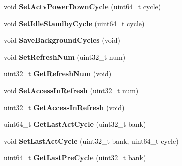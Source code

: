 \begin{DoxyCompactItemize}
\item 
\hypertarget{classMemRankBase_a9da28403ebdbd8dc07d48da72fcbdbc1}{void {\bfseries Set\-Actv\-Power\-Down\-Cycle} (uint64\-\_\-t cycle)}\label{classMemRankBase_a9da28403ebdbd8dc07d48da72fcbdbc1}

\item 
\hypertarget{classMemRankBase_a18cd5cda2b0a251514e4d9352d500501}{void {\bfseries Set\-Idle\-Standby\-Cycle} (uint64\-\_\-t cycle)}\label{classMemRankBase_a18cd5cda2b0a251514e4d9352d500501}

\item 
\hypertarget{classMemRankBase_ac529c40189c3c3e1afd4cea23967d6c8}{void {\bfseries Save\-Background\-Cycles} (void)}\label{classMemRankBase_ac529c40189c3c3e1afd4cea23967d6c8}

\item 
\hypertarget{classMemRankBase_a2e83901b9c88cf3fd75eab94db30c14b}{void {\bfseries Set\-Refresh\-Num} (uint32\-\_\-t num)}\label{classMemRankBase_a2e83901b9c88cf3fd75eab94db30c14b}

\item 
\hypertarget{classMemRankBase_ae40cd8704dd8b1d50ca359dccdbedbff}{uint32\-\_\-t {\bfseries Get\-Refresh\-Num} (void)}\label{classMemRankBase_ae40cd8704dd8b1d50ca359dccdbedbff}

\item 
\hypertarget{classMemRankBase_ab2b3338aee684271469fbcb008f09834}{void {\bfseries Set\-Access\-In\-Refresh} (uint32\-\_\-t num)}\label{classMemRankBase_ab2b3338aee684271469fbcb008f09834}

\item 
\hypertarget{classMemRankBase_ac923937912dd8d601e4390b8a0dd098f}{uint32\-\_\-t {\bfseries Get\-Access\-In\-Refresh} (void)}\label{classMemRankBase_ac923937912dd8d601e4390b8a0dd098f}

\item 
\hypertarget{classMemRankBase_a853d565b6036ec7c856e0d31f8e0a5dd}{uint64\-\_\-t {\bfseries Get\-Last\-Act\-Cycle} (uint32\-\_\-t bank)}\label{classMemRankBase_a853d565b6036ec7c856e0d31f8e0a5dd}

\item 
\hypertarget{classMemRankBase_a5901d260fdfffc68ff384dc2d73b6eb9}{void {\bfseries Set\-Last\-Act\-Cycle} (uint32\-\_\-t bank, uint64\-\_\-t cycle)}\label{classMemRankBase_a5901d260fdfffc68ff384dc2d73b6eb9}

\item 
\hypertarget{classMemRankBase_a0861380baea379e2285684a16b4f5fa0}{uint64\-\_\-t {\bfseries Get\-Last\-Pre\-Cycle} (uint32\-\_\-t bank)}\label{classMemRankBase_a0861380baea379e2285684a16b4f5fa0}


\end{DoxyCompactItemize}
